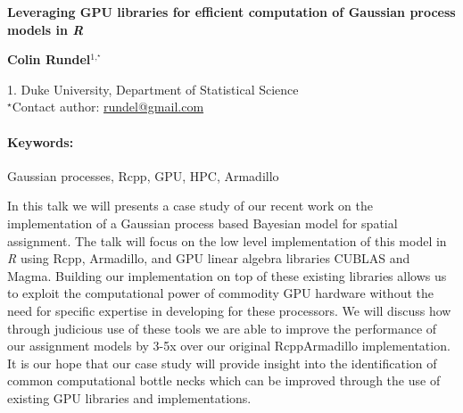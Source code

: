 \documentclass[11pt, a4paper]{article}
\newcommand{\pkg}[1]{{\normalfont\fontseries{b}\selectfont #1}}
\let\proglang=\textit
\renewcommand{\title}[1]{\begin{center}{\bf \LARGE #1}\end{center}}
\newcommand{\keywords}{\paragraph{Keywords:}}
\begin{document}
\pagestyle{empty}

\title{Leveraging GPU libraries for efficient computation of Gaussian process models in \proglang{R}}

\begin{center}
  {\bf Colin Rundel$^{1,^\star}$}
\end{center}

\begin{affiliations}
1. Duke University, Department of Statistical Science \\[-2pt]
$^\star$Contact author: \href{mailto:rundel@gmail.com}{rundel@gmail.com}\\
\end{affiliations}

\keywords Gaussian processes, Rcpp, GPU, HPC, Armadillo

\vskip 0.8cm



In this talk we will presents a case study of our recent work on the implementation of a Gaussian process based Bayesian model for spatial assignment. The talk will focus on the low level implementation of this model in \proglang{R} using \pkg{Rcpp}, \pkg{Armadillo}, and GPU linear algebra libraries \pkg{CUBLAS} and \pkg{Magma}. Building our implementation on top of these existing libraries allows us to exploit the computational power of commodity GPU hardware without the need for specific expertise in developing for these processors. We will discuss how through judicious use of these tools we are able to improve the performance of our assignment models by 3-5x over our original \pkg{RcppArmadillo} implementation.  It is our hope that our case study will provide insight into the identification of common computational bottle necks which can be improved through the use of existing GPU libraries and implementations.
\end{document}
